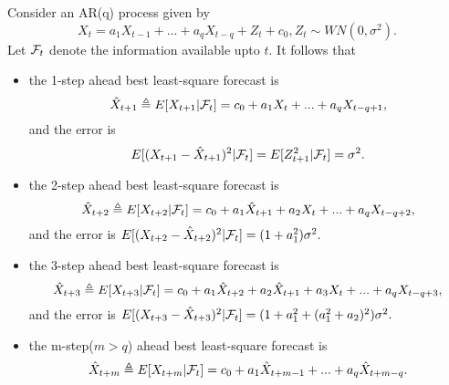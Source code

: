 \begin{lemma}\cite[55]{tsay2005analysis}
	Consider an AR(q) process given by $$X_t = a_1 X_{t-1} + ... + a_q X_{t-q} + Z_t + c_0, Z_t\sim WN(0,\sigma^2).$$ Let $\mathcal{F}_t$ denote the information available upto $t$. It follows that
	\begin{itemize}
		\item the 1-step ahead best least-square forecast is
		$$\hat{X}_{t+1} \triangleq E[X_{t+1}|\mathcal{F}_t] = c_0 + a_1X_t + ... + a_q X_{t-q+1},$$
		and the error is $$E[(X_{t+1} - \hat{X}_{t+1})^2|\mathcal{F}_t] =E[Z_{t+1}^2|\mathcal{F}_t] = \sigma^2.$$	
		\item the 2-step ahead best least-square forecast is
		$$\hat{X}_{t+2} \triangleq E[X_{t+2}|\mathcal{F}_t] = c_0 + a_1\hat{X}_{t+1} + a_2 X_t + ... +a_q X_{t-q+2},$$
		and the error is $E[(X_{t+2} - \hat{X}_{t+2})^2|\mathcal{F}_t] = (1 + a_1^2)\sigma^2.$	
		\item the 3-step ahead best least-square forecast is
		$$\hat{X}_{t+3}\triangleq E[X_{t+3}|\mathcal{F}_t] = c_0 + a_1\hat{X}_{t+2} + a_2\hat{X}_{t+1} + a_3X_{t} + ... + a_q X_{t-q+3},$$
		and the error is $E[(X_{t+3} - \hat{X}_{t+3})^2|\mathcal{F}_t] = (1 + a_1^2 + (a_1^2 + a_2)^2)\sigma^2.$
		\item the m-step($m > q$) ahead best least-square forecast is
		$$\hat{X}_{t+m}\triangleq E[X_{t+m}|\mathcal{F}_t] = c_0 + a_1 \hat{X}_{t+m-1}+...+a_q \hat{X}_{t+m-q}.$$

	\end{itemize}
\end{lemma}
